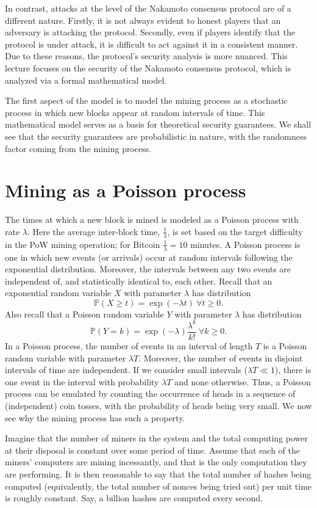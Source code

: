 \documentclass{article}
\begin{document}
In contrast, attacks at the level of the Nakamoto consensus protocol are of a different nature. Firstly, it is not always evident to honest players that an adversary is attacking the protocol. Secondly, even if players identify that the protocol is under attack, it is difficult to act against it in a consistent manner.   Due to these reasons, the protocol's security analysis is more nuanced. This lecture focuses on the security of the Nakamoto consensus protocol, which is analyzed via a formal mathematical model. 

The first aspect of the model is to model the mining process as a stochastic process in which new blocks appear at random intervals of time. This mathematical model serves as a basis for theoretical security guarantees. We shall see that the security guarantees are probabilistic in nature, with the randomness factor coming  from the mining process.

\section*{Mining as a Poisson process}
The times at which a new block is mined is modeled as a Poisson process with rate $\lambda$. Here the average inter-block time,  $\frac{1}{\lambda}$, is set based on the target difficulty in the PoW mining operation; for Bitcoin $\frac{1}{\lambda} = 10$ minutes.  A Poisson process is one in which new events (or arrivals) occur at random intervals  following the  exponential distribution. Moreover, the intervals between any two events are independent of, and statistically identical to,  each other. Recall that an exponential random variable $X$ with parameter $\lambda$ has distribution 
\[\mathbb{P}(X \geq t) = \exp(-\lambda t) \ \forall t \geq 0.\]
Also recall that a Poisson random variable $Y$ with parameter $\lambda$ has distribution 
\[\mathbb{P}(Y = k) = \exp(-\lambda) \frac{\lambda^k}{k!} \ \forall k \geq 0.\]
In a Poisson process, the number of events in an interval of length $T$ is a Poisson random variable with parameter $\lambda T$. Moreover, the number of events in disjoint intervals of time are independent. If we consider small intervals ($\lambda T \ll 1$), there is one event in the interval with probability $\lambda T$ and none otherwise. Thus, a Poisson process can be emulated by  counting the occurrence of heads in a sequence of (independent) coin tosses, with the probability of heads being very small. We now see why the mining process has such a property.

Imagine that the number of miners in the system and the total computing power at their disposal is constant over some period of time. Assume that each of the miners' computers are mining incessantly, and that is the only computation they are performing. It is then reasonable to say that the total number of hashes being computed (equivalently, the total number of nonces being tried out) per unit time is roughly constant. Say, a billion hashes are computed every second. 
\end{document}
